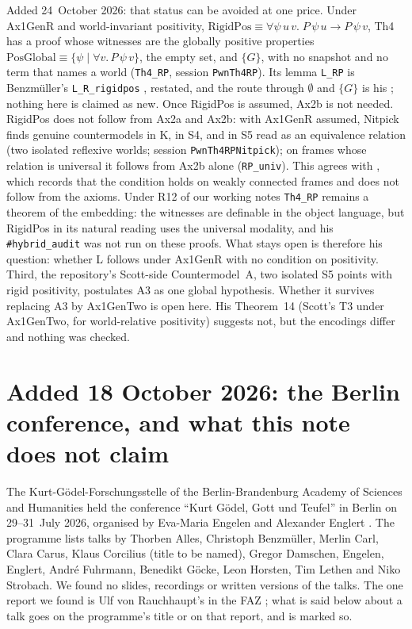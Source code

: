 \documentclass[11pt,a4paper]{article}
\newcommand{\lean}[1]{\texttt{#1}}
\theoremstyle{definition}
\theoremstyle{remark}
\begin{document}
Added 24~October 2026: that status can be avoided at one price.
Under Ax1GenR and world-invariant positivity,
\(\mathrm{RigidPos} \equiv \forall\psi\,u\,v.\; P\,\psi\,u \longrightarrow P\,\psi\,v\),
Th4 has a proof whose witnesses are the globally positive properties
\(\mathrm{PosGlobal} \equiv \{\psi \mid \forall v.\, P\,\psi\,v\}\), the empty
set, and \(\{G\}\), with no snapshot and no term that names a world
(\lean{Th4\_RP}, session \lean{PwnTh4RP}).
Its lemma \lean{L\_RP} is Benzm\"uller's \lean{L\_R\_rigidpos}
\cite[v4, Sect.~6.4.3]{benzmuellerPWN2026}, restated, and the route through
\(\emptyset\) and \(\{G\}\) is his \cite[v4, Sect.~6.4]{benzmuellerPWN2026};
nothing here is claimed as new.
Once RigidPos is assumed, Ax2b is not needed.
RigidPos does not follow from Ax2a and Ax2b: with Ax1GenR assumed, Nitpick
finds genuine countermodels in K, in S4, and in S5 read as an equivalence
relation (two isolated reflexive worlds; session \lean{PwnTh4RPNitpick}); on
frames whose relation is universal it follows from Ax2b alone
(\lean{RP\_univ}).
This agrees with \cite[v4, Sect.~6.4.3]{benzmuellerPWN2026}, which records that
the condition holds on weakly connected frames and does not follow from the
axioms.
Under R12 of our working notes \lean{Th4\_RP} remains a theorem of the
embedding: the witnesses are definable in the object language, but RigidPos
in its natural reading uses the universal modality, and his
\lean{\#hybrid\_audit} was not run on these proofs.
What stays open is therefore his question: whether L follows under Ax1GenR
with no condition on positivity.
Third, the repository's Scott-side Countermodel~A, two isolated S5 points
with rigid positivity, postulates A3 as one global hypothesis.
Whether it survives replacing A3 by Ax1GenTwo is open here.
His Theorem~14 (Scott's T3 under Ax1GenTwo, for world-relative positivity)
suggests not, but the encodings differ and nothing was checked.

\section{Added 18 October 2026: the Berlin conference, and what this note does not claim}
\label{sec:bbaw}

The Kurt-G\"odel-Forschungsstelle of the Berlin-Brandenburg Academy of
Sciences and Humanities held the conference ``Kurt G\"odel,
\guilsinglright Gott\guilsinglleft{} und \guilsinglright Teufel\guilsinglleft'' in Berlin on 29--31~July 2026,
organised by Eva-Maria Engelen and Alexander Englert \cite{bbaw2026}.
The programme lists talks by Thorben Alles, Christoph Benzm\"uller, Merlin
Carl, Clara Carus, Klaus Corcilius (title to be named), Gregor Damschen,
Engelen, Englert, Andr\'e Fuhrmann, Benedikt G\"ocke, Leon Horsten, Tim
Lethen and Niko Strobach.
We found no slides, recordings or written versions of the talks.
The one report we found is Ulf von Rauchhaupt's in the FAZ
\cite{vonRauchhaupt2026}; what is said below about a talk goes on the
programme's title or on that report, and is marked so.
\end{document}
